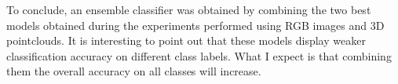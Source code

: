\documentclass[11pt,a4paper]{article}
\begin{document}
To conclude, an ensemble classifier was obtained by combining the two best models obtained during the experiments performed using RGB images and 3D pointclouds. It is interesting to point out that these models display weaker classification accuracy on different class labels. What I expect is that combining them the overall accuracy on all classes will increase.
\begin{figure}[H]
    \hspace*{-1cm}
    \qquad
\end{figure}
\end{document}
